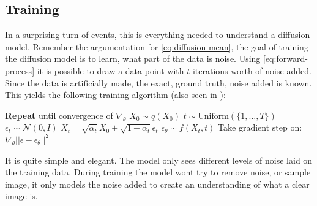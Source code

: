 \subsection{Training}
In a surprising turn of events, this is everything needed to understand a diffusion model. Remember the argumentation for \autoref{eq:diffusion-mean}, the goal of training the diffusion model is to learn, what part of the data is noise. Using \autoref{eq:forward-process} it is possible to draw a data point with $t$ iterations worth of noise added. Since the data is artificially made, the exact, ground truth, noise added is known. This yields the following training algorithm (also seen in \cite{ddpm}):
\begin{algorithm}
\caption{Training} \label{alg:training}
\begin{algorithmic}[1]
    \Statex \textbf{Repeat} until convergence of $\nabla_{\theta}$
    \State $X_0 \sim q(X_0)$
    \State $t \sim \text{Uniform}(\{1, \dots, T\})$
    \State $\epsilon_t \sim \mathcal{N}(0, I)$
    \State $X_t = \sqrt{\bar{\alpha}_t}X_0+\sqrt{1-\bar{\alpha}_t} \epsilon_t$
    \State $\epsilon_{\theta} \sim f(X_t, t)$ 
    \State Take gradient step on: $\nabla_{\theta} || \epsilon - \epsilon_{\theta}||^2$ 
\end{algorithmic}
\end{algorithm}

It is quite simple and elegant. The model only sees different levels of noise laid on the training data. During training the model wont try to remove noise, or sample image, it only models the noise added to create an understanding of what a clear image is.

\newpage

